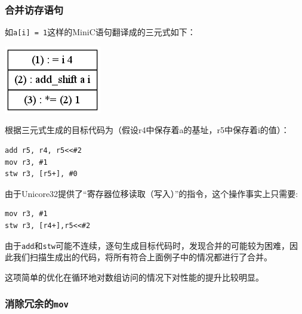 \subsubsection{合并访存语句}
如\verb|a[i] = 1|这样的MiniC语句翻译成的三元式如下：
\begin{center}
	\includegraphics[scale=0.50]{merge_ldst.png}
	\label{fig:mergeldst}
\end{center}
根据三元式生成的目标代码为（假设r4中保存着a的基址，r5中保存着i的值）：
\begin{verbatim}
add r5, r4, r5<<#2
mov r3, #1
stw r3, [r5+], #0
\end{verbatim}
由于Unicore32提供了“寄存器位移读取（写入）”的指令，这个操作事实上只需要:
\begin{verbatim}
mov r3, #1
stw r3, [r4+],r5<<#2
\end{verbatim}
由于\verb|add|和\verb|stw|可能不连续，逐句生成目标代码时，发现合并的可能较为困难，因此我们扫描生成出的代码，将所有符合上面例子中的情况都进行了合并。

这项简单的优化在循环地对数组访问的情况下对性能的提升比较明显。
\subsubsection{消除冗余的\lstinline|mov|}



